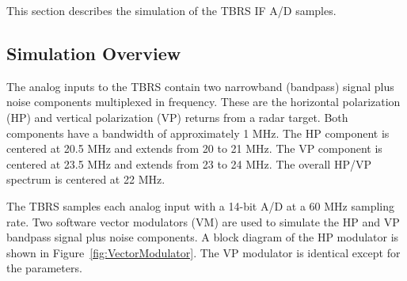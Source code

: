 \documentclass[12pt,english]{article}
\begin{document}
This section describes the simulation of the TBRS IF A/D samples.

\subsection{Simulation Overview}

The analog inputs to the TBRS contain two narrowband (bandpass) signal
plus noise components multiplexed in frequency. These are the
horizontal polarization (HP) and vertical polarization (VP) returns
from a radar target. Both components have a bandwidth of approximately
1 MHz. The HP component is centered at 20.5 MHz and extends from 20 to
21 MHz. The VP component is centered at 23.5 MHz and extends from 23
to 24 MHz. The overall HP/VP spectrum is centered at 22 MHz.

The TBRS samples each analog input with a 14-bit A/D at a 60 MHz
sampling rate. Two software vector modulators (VM) are used to
simulate the HP and VP bandpass signal plus noise components.  A block
diagram of the HP modulator is shown in Figure~\vref{fig:VectorModulator}.
The VP modulator is identical except for the parameters.
\end{document}

